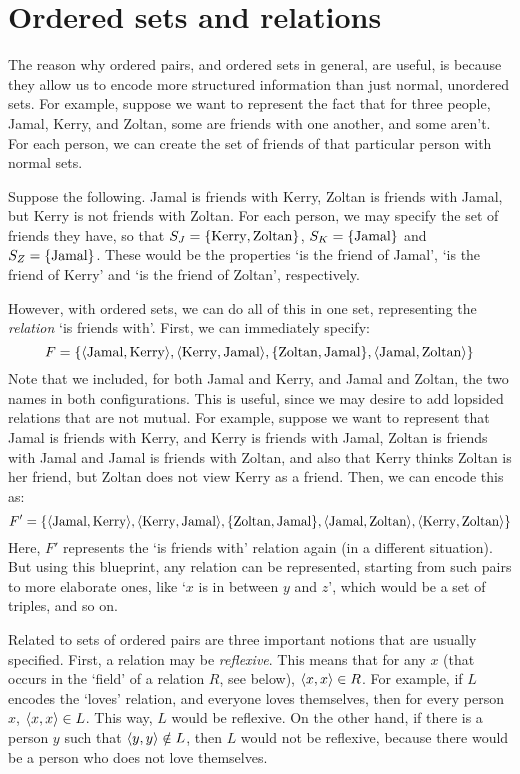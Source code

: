 \section{Ordered sets and relations}

The reason why ordered pairs, and ordered sets in general, are useful, is because they allow us to encode more structured information than just normal, unordered sets. For example, suppose we want to represent the fact that for three people, Jamal, Kerry, and Zoltan, some are friends with one another, and some aren't. For each person, we can create the set of friends of that particular person with normal sets. 

Suppose the following. Jamal is friends with Kerry, Zoltan is friends with Jamal, but Kerry is not friends with Zoltan. For each person, we may specify the set of friends they have, so that $S_J=\{\text{Kerry}, \text{Zoltan}\}$, $S_K=\{\text{Jamal}\}$ and $S_Z=\{\text{Jamal}\}$. These would be the properties `is the friend of Jamal', `is the friend of Kerry' and `is the friend of Zoltan', respectively. 

However, with ordered sets, we can do all of this in one set, representing the \textit{relation} `is friends with'. First, we can immediately specify: 
%
\[F=\{\langle\text{Jamal}, \text{Kerry}\rangle, \langle\text{Kerry}, \text{Jamal}\rangle, \{\text{Zoltan}, \text{Jamal}\}, \langle\text{Jamal}, \text{Zoltan}\rangle\}\]
%
Note that we included, for both Jamal and Kerry, and Jamal and Zoltan, the two names in both configurations. This is useful, since we may desire to add lopsided relations that are not mutual. For example, suppose we want to represent that Jamal is friends with Kerry, and Kerry is friends with Jamal, Zoltan is friends with Jamal and Jamal is friends with Zoltan, and also that Kerry thinks Zoltan is her friend, but Zoltan does not view Kerry as a friend. Then, we can encode this as: 
%
\[F'=\{\langle\text{Jamal}, \text{Kerry}\rangle, \langle\text{Kerry}, \text{Jamal}\rangle, \{\text{Zoltan}, \text{Jamal}\}, \langle\text{Jamal}, \text{Zoltan}\rangle, \langle\text{Kerry}, \text{Zoltan}\rangle\}\]
%
Here, $F'$ represents the `is friends with' relation again (in a different situation). But using this blueprint, any relation can be represented, starting from such pairs to more elaborate ones, like `$x$ is in between $y$ and $z$', which would be a set of triples, and so on. 

Related to sets of ordered pairs are three important notions that are usually specified. First, a relation may be \textit{reflexive}. This means that for any $x$ (that occurs in the `field' of a relation $R$, see below), $\langle x, x\rangle \in R$. For example, if $L$ encodes the `loves' relation, and everyone loves themselves, then for every person $x$, $\langle x, x\rangle \in L$. This way, $L$ would be reflexive. On the other hand, if there is a person $y$ such that $\langle y, y\rangle \notin L$, then $L$ would not be reflexive, because there would be a person who does not love themselves. 

